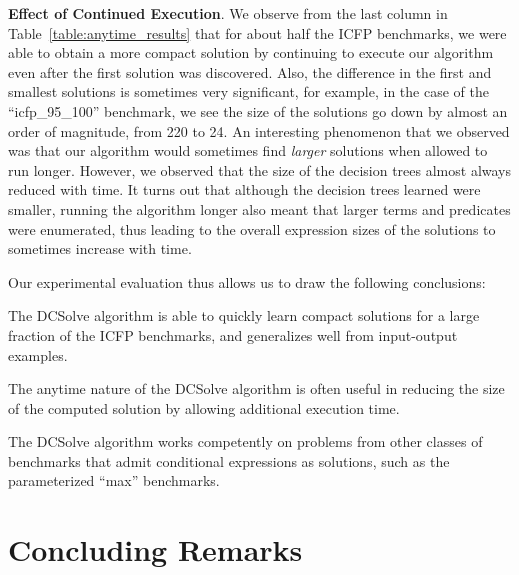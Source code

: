 \documentclass{llncs}
\newcommand{\dcsolve}{{\sffamily\fontsize{8.5}{10}\selectfont
    DCSolve}\xspace}
\renewcommand{\paragraph}[1]{\par\noindent\textbf{#1}.}
\begin{document}
\paragraph{Effect of Continued Execution}
We observe from the last column in Table~\ref{table:anytime_results}
that for about half the ICFP benchmarks, we were able to obtain a more
compact solution by continuing to execute our algorithm even after the
first solution was discovered. Also, the difference in the first and
smallest solutions is sometimes very significant, for example, in the
case of the ``icfp\_95\_100'' benchmark, we see the size of the
solutions go down by almost an order of magnitude, from 220 to 24. An
interesting phenomenon that we observed was that our algorithm would
sometimes find \emph{larger} solutions when allowed to run
longer. However, we observed that the size of the decision trees
almost always reduced with time. It turns out that although the
decision trees learned were smaller, running the algorithm longer also
meant that larger terms and predicates were enumerated, thus leading
to the overall expression sizes of the solutions to sometimes increase
with time.

Our experimental evaluation thus allows us to draw the following
conclusions:
\begin{inparaenum}[(a)]
\item
The \dcsolve algorithm is able to quickly learn compact solutions for
a large fraction of the ICFP benchmarks, and generalizes well from
input-output examples.
\item
The anytime nature of the \dcsolve algorithm is often useful in
reducing the size of the computed solution by allowing additional
execution time.
\item
The \dcsolve algorithm works competently on problems from other
classes of benchmarks that admit conditional expressions as solutions,
such as the parameterized ``max'' benchmarks.
\end{inparaenum}

\section{Concluding Remarks}
\label{sec:conclusion}
\end{document}
